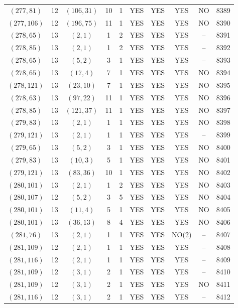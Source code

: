 \begin{longtable}{|c|c|c|c|c|c|c|c|c|c|}
$(277, 81)$ & 12 & $(106, 31)$ & 10 & 1 & YES & YES & YES & NO & 8389\\
$(277, 106)$ & 12 & $(196, 75)$ & 11 & 1 & YES & YES & YES & NO & 8390\\
$(278, 65)$ & 13 & $(2, 1)$ & 1 & 2 & YES & YES & YES & -- & 8391\\
$(278, 85)$ & 13 & $(2, 1)$ & 1 & 2 & YES & YES & YES & -- & 8392\\
$(278, 65)$ & 13 & $(5, 2)$ & 3 & 1 & YES & YES & YES & -- & 8393\\
$(278, 65)$ & 13 & $(17, 4)$ & 7 & 1 & YES & YES & YES & NO & 8394\\
$(278, 121)$ & 13 & $(23, 10)$ & 7 & 1 & YES & YES & YES & NO & 8395\\
$(278, 63)$ & 13 & $(97, 22)$ & 11 & 1 & YES & YES & YES & NO & 8396\\
$(278, 85)$ & 13 & $(121, 37)$ & 11 & 1 & YES & YES & YES & NO & 8397\\
$(279, 83)$ & 13 & $(2, 1)$ & 1 & 1 & YES & YES & YES & NO & 8398\\
$(279, 121)$ & 13 & $(2, 1)$ & 1 & 1 & YES & YES & YES & -- & 8399\\
$(279, 65)$ & 13 & $(5, 2)$ & 3 & 1 & YES & YES & YES & NO & 8400\\
$(279, 83)$ & 13 & $(10, 3)$ & 5 & 1 & YES & YES & YES & NO & 8401\\
$(279, 121)$ & 13 & $(83, 36)$ & 10 & 1 & YES & YES & YES & NO & 8402\\
$(280, 101)$ & 13 & $(2, 1)$ & 1 & 2 & YES & YES & YES & NO & 8403\\
$(280, 107)$ & 12 & $(5, 2)$ & 3 & 5 & YES & YES & YES & NO & 8404\\
$(280, 101)$ & 13 & $(11, 4)$ & 5 & 1 & YES & YES & YES & NO & 8405\\
$(280, 101)$ & 13 & $(36, 13)$ & 8 & 4 & YES & YES & YES & NO & 8406\\
$(281, 76)$ & 13 & $(2, 1)$ & 1 & 1 & YES & YES & NO(2) & -- & 8407\\
$(281, 109)$ & 12 & $(2, 1)$ & 1 & 1 & YES & YES & YES & -- & 8408\\
$(281, 116)$ & 12 & $(2, 1)$ & 1 & 1 & YES & YES & YES & -- & 8409\\
$(281, 109)$ & 12 & $(3, 1)$ & 2 & 1 & YES & YES & YES & -- & 8410\\
$(281, 109)$ & 12 & $(3, 1)$ & 2 & 1 & YES & YES & YES & NO & 8411\\
$(281, 116)$ & 12 & $(3, 1)$ & 2 & 1 & YES & YES & YES & -- & 8412\\

\end{longtable}
